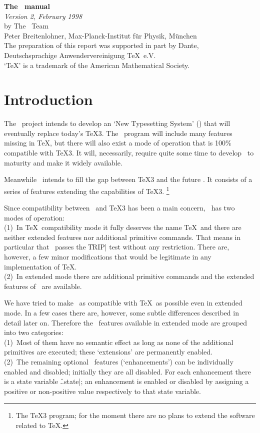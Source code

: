 \documentclass{article}
\begin{document}
\begin{center}
{\huge\bf The \eTeX\ manual}\\[6pt]
{\sl Version 2, February 1998\/}\\[18pt]
by The \NTS\ Team\\[6pt]
Peter Breitenlohner, Max-Planck-Institut f\"ur Physik, M\"unchen\\[18pt]
\small\noindent
The preparation of this report was supported in part by {\sc Dante},\\
Deutschsprachige Anwendervereinigung \TeX\ e.V.\\
`\TeX' is a trademark of the American Mathematical Society.
\end{center}

\section{Introduction}

The \NTS\ project intends to develop an `New Typesetting System' (\NTS)
that will eventually replace today's \TeX3.  The \NTS\ program will
include many features missing in \TeX, but there will also exist a mode
of operation that is 100\% compatible with \TeX3.  It will, necessarily,
require quite some time to develop \NTS\ to maturity and make it widely
available.

Meanwhile \eTeX\ intends to fill the gap between \TeX3 and the future
\NTS. It consists of a series of features extending the capabilities of
\TeX3.%
\footnote{The \TeX3 program; for the moment there are no plans to extend
the software related to \TeX.}

Since compatibility between \eTeX\ and \TeX3 has been a main concern,
\eTeX\ has two modes of operation:\\
(1)~In \TeX\ compatibility mode it fully deserves the name \TeX\ and
there are neither extended features nor additional primitive commands.
That means in particular that \eTeX\ passes the \|TRIP| test
\cite{tripman} without any restriction.  There are, however, a few
minor modifications that would be legitimate in any implementation of
\TeX.\\
(2)~In extended mode there are additional primitive commands and the
extended features of \eTeX\ are available.

We have tried to make \eTeX\ as compatible with \TeX\ as possible
even in extended mode.  In a few cases there are, however, some subtle
differences described in detail later on.  Therefore the \eTeX\ features
available in extended mode are grouped into two categories:\\
(1)~Most of them have no semantic effect as long as none of the
additional primitives are executed; these `extensions' are permanently
enabled.\\
(2)~The remaining optional \eTeX\ features (`enhancements') can be
individually enabled and disabled; initially they are all disabled.
For each enhancement there is a state variable \|\...state|; an
enhancement is enabled or disabled by assigning a positive or
non-positive value respectively to that state variable.
\end{document}
